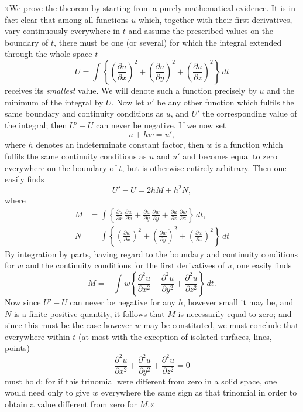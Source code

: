 \documentclass{article}
\begin{document}
»We prove the theorem by starting from a purely mathematical evidence. It is in fact clear that among all functions $u$ which, together with their first derivatives, vary continuously everywhere in $t$ and assume the prescribed values on the boundary of $t$, there must be one (or several) for which the integral extended through the whole space $t$
\[
U = \int\left\{\left(\frac{\partial u}{\partial x}\right)^{2} + \left(\frac{\partial u}{\partial y}\right)^{2} + \left(\frac{\partial u}{\partial z}\right)^{2}\right\}\,dt
\]
receives its \emph{smallest} value. We will denote such a function precisely by $u$ and the minimum of the integral by $U$. Now let $u'$ be any other function which fulfils the same boundary and continuity conditions as $u$, and $U'$ the corresponding value of the integral; then $U'-U$ can never be negative. If we now set
\[
u + hw = u',
\]
where $h$ denotes an indeterminate constant factor, then $w$ is a function which fulfils the same continuity conditions as $u$ and $u'$ and becomes equal to zero everywhere on the boundary of $t$, but is otherwise entirely arbitrary. Then one easily finds
\[
U'-U = 2hM + h^{2}N,
\]
where
\[
\begin{aligned}
M &= \int\left\{\frac{\partial u}{\partial x}\,\frac{\partial w}{\partial x} + \frac{\partial u}{\partial y}\,\frac{\partial w}{\partial y} + \frac{\partial u}{\partial z}\,\frac{\partial w}{\partial z}\right\}\,dt, \\
N &= \int\left\{\left(\frac{\partial w}{\partial x}\right)^{2} + \left(\frac{\partial w}{\partial y}\right)^{2} + \left(\frac{\partial w}{\partial z}\right)^{2}\right\}\,dt
\end{aligned}
\]
By integration by parts, having regard to the boundary and continuity conditions for $w$ and the continuity conditions for the first derivatives of $u$, one easily finds
\[
M = -\int w\left\{\frac{\partial^{2}u}{\partial x^{2}} + \frac{\partial^{2}u}{\partial y^{2}} + \frac{\partial^{2}u}{\partial z^{2}}\right\}\,dt.
\]
Now since $U'-U$ can never be negative for any $h$, however small it may be, and $N$ is a finite positive quantity, it follows that $M$ is necessarily equal to zero; and since this must be the case however $w$ may be constituted, we must conclude that everywhere within $t$ (at most with the exception of isolated surfaces, lines, points)
\[
\frac{\partial^{2}u}{\partial x^{2}} + \frac{\partial^{2}u}{\partial y^{2}} + \frac{\partial^{2}u}{\partial z^{2}} = 0
\]
must hold; for if this trinomial were different from zero in a solid space, one would need only to give $w$ everywhere the same sign as that trinomial in order to obtain a value different from zero for $M$.«
\end{document}
